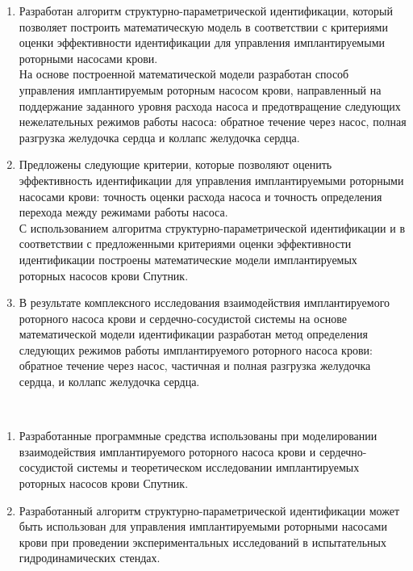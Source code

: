 \novelty
\begin{enumerate}
  \item Разработан алгоритм структурно-параметрической идентификации, который позволяет построить математическую модель в соответствии с критериями оценки эффективности идентификации для управления имплантируемыми роторными насосами крови. \\На основе построенной математической модели разработан способ управления имплантируемым роторным насосом крови, направленный на поддержание заданного уровня расхода насоса и предотвращение следующих нежелательных режимов работы насоса: обратное течение через насос, полная разгрузка желудочка сердца и коллапс желудочка сердца.
  \item Предложены следующие критерии, которые позволяют оценить эффективность идентификации для управления имплантируемыми роторными насосами крови: точность оценки расхода насоса и точность определения перехода между режимами работы насоса. \\С использованием алгоритма структурно-параметрической идентификации и в соответствии с предложенными критериями оценки эффективности идентификации построены математические модели имплантируемых роторных насосов крови Спутник.
  \item В результате комплексного исследования взаимодействия имплантируемого роторного насоса крови и сердечно-сосудистой системы на основе математической модели идентификации разработан метод определения следующих режимов работы имплантируемого роторного насоса крови: обратное течение через насос, частичная и полная разгрузка желудочка сердца, и коллапс желудочка сердца.
\end{enumerate}


\influence\ 
\begin{enumerate}
 \item Разработанные программные средства использованы при моделировании взаимодействия имплантируемого роторного насоса крови и сердечно-сосудистой системы и теоретическом исследовании имплантируемых роторных насосов крови Спутник. 
 \item Разработанный алгоритм структурно-параметрической идентификации может быть использован для управления имплантируемыми роторными насосами крови при проведении экспериментальных исследований в испытательных гидродинамических стендах. %
\end{enumerate}

